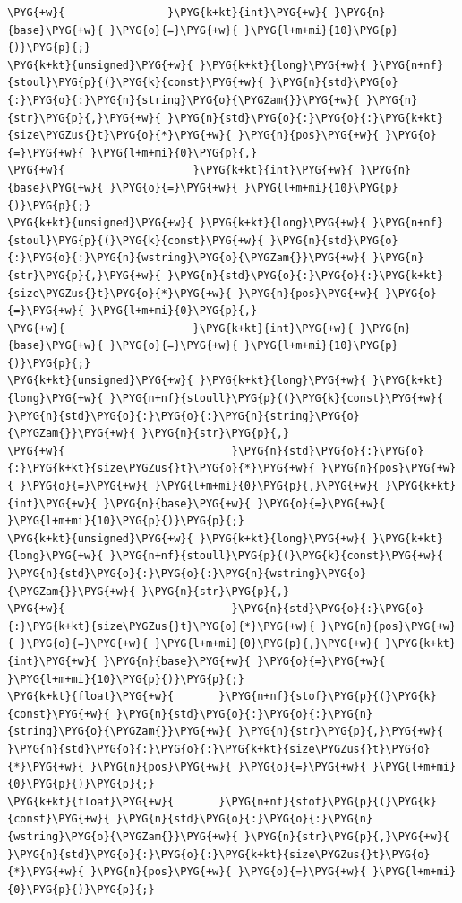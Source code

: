 \begin{codeblockbg}
\begin{Verbatim}[commandchars=\\\{\},breaklines=true,breakanywhere=true,fontsize=\codefont,xleftmargin=17bp]
\PYG{+w}{                }\PYG{k+kt}{int}\PYG{+w}{ }\PYG{n}{base}\PYG{+w}{ }\PYG{o}{=}\PYG{+w}{ }\PYG{l+m+mi}{10}\PYG{p}{)}\PYG{p}{;}
\PYG{k+kt}{unsigned}\PYG{+w}{ }\PYG{k+kt}{long}\PYG{+w}{ }\PYG{n+nf}{stoul}\PYG{p}{(}\PYG{k}{const}\PYG{+w}{ }\PYG{n}{std}\PYG{o}{:}\PYG{o}{:}\PYG{n}{string}\PYG{o}{\PYGZam{}}\PYG{+w}{ }\PYG{n}{str}\PYG{p}{,}\PYG{+w}{ }\PYG{n}{std}\PYG{o}{:}\PYG{o}{:}\PYG{k+kt}{size\PYGZus{}t}\PYG{o}{*}\PYG{+w}{ }\PYG{n}{pos}\PYG{+w}{ }\PYG{o}{=}\PYG{+w}{ }\PYG{l+m+mi}{0}\PYG{p}{,}
\PYG{+w}{                    }\PYG{k+kt}{int}\PYG{+w}{ }\PYG{n}{base}\PYG{+w}{ }\PYG{o}{=}\PYG{+w}{ }\PYG{l+m+mi}{10}\PYG{p}{)}\PYG{p}{;}
\PYG{k+kt}{unsigned}\PYG{+w}{ }\PYG{k+kt}{long}\PYG{+w}{ }\PYG{n+nf}{stoul}\PYG{p}{(}\PYG{k}{const}\PYG{+w}{ }\PYG{n}{std}\PYG{o}{:}\PYG{o}{:}\PYG{n}{wstring}\PYG{o}{\PYGZam{}}\PYG{+w}{ }\PYG{n}{str}\PYG{p}{,}\PYG{+w}{ }\PYG{n}{std}\PYG{o}{:}\PYG{o}{:}\PYG{k+kt}{size\PYGZus{}t}\PYG{o}{*}\PYG{+w}{ }\PYG{n}{pos}\PYG{+w}{ }\PYG{o}{=}\PYG{+w}{ }\PYG{l+m+mi}{0}\PYG{p}{,}
\PYG{+w}{                    }\PYG{k+kt}{int}\PYG{+w}{ }\PYG{n}{base}\PYG{+w}{ }\PYG{o}{=}\PYG{+w}{ }\PYG{l+m+mi}{10}\PYG{p}{)}\PYG{p}{;}
\PYG{k+kt}{unsigned}\PYG{+w}{ }\PYG{k+kt}{long}\PYG{+w}{ }\PYG{k+kt}{long}\PYG{+w}{ }\PYG{n+nf}{stoull}\PYG{p}{(}\PYG{k}{const}\PYG{+w}{ }\PYG{n}{std}\PYG{o}{:}\PYG{o}{:}\PYG{n}{string}\PYG{o}{\PYGZam{}}\PYG{+w}{ }\PYG{n}{str}\PYG{p}{,}
\PYG{+w}{                          }\PYG{n}{std}\PYG{o}{:}\PYG{o}{:}\PYG{k+kt}{size\PYGZus{}t}\PYG{o}{*}\PYG{+w}{ }\PYG{n}{pos}\PYG{+w}{ }\PYG{o}{=}\PYG{+w}{ }\PYG{l+m+mi}{0}\PYG{p}{,}\PYG{+w}{ }\PYG{k+kt}{int}\PYG{+w}{ }\PYG{n}{base}\PYG{+w}{ }\PYG{o}{=}\PYG{+w}{ }\PYG{l+m+mi}{10}\PYG{p}{)}\PYG{p}{;}
\PYG{k+kt}{unsigned}\PYG{+w}{ }\PYG{k+kt}{long}\PYG{+w}{ }\PYG{k+kt}{long}\PYG{+w}{ }\PYG{n+nf}{stoull}\PYG{p}{(}\PYG{k}{const}\PYG{+w}{ }\PYG{n}{std}\PYG{o}{:}\PYG{o}{:}\PYG{n}{wstring}\PYG{o}{\PYGZam{}}\PYG{+w}{ }\PYG{n}{str}\PYG{p}{,}
\PYG{+w}{                          }\PYG{n}{std}\PYG{o}{:}\PYG{o}{:}\PYG{k+kt}{size\PYGZus{}t}\PYG{o}{*}\PYG{+w}{ }\PYG{n}{pos}\PYG{+w}{ }\PYG{o}{=}\PYG{+w}{ }\PYG{l+m+mi}{0}\PYG{p}{,}\PYG{+w}{ }\PYG{k+kt}{int}\PYG{+w}{ }\PYG{n}{base}\PYG{+w}{ }\PYG{o}{=}\PYG{+w}{ }\PYG{l+m+mi}{10}\PYG{p}{)}\PYG{p}{;}
\PYG{k+kt}{float}\PYG{+w}{       }\PYG{n+nf}{stof}\PYG{p}{(}\PYG{k}{const}\PYG{+w}{ }\PYG{n}{std}\PYG{o}{:}\PYG{o}{:}\PYG{n}{string}\PYG{o}{\PYGZam{}}\PYG{+w}{ }\PYG{n}{str}\PYG{p}{,}\PYG{+w}{ }\PYG{n}{std}\PYG{o}{:}\PYG{o}{:}\PYG{k+kt}{size\PYGZus{}t}\PYG{o}{*}\PYG{+w}{ }\PYG{n}{pos}\PYG{+w}{ }\PYG{o}{=}\PYG{+w}{ }\PYG{l+m+mi}{0}\PYG{p}{)}\PYG{p}{;}
\PYG{k+kt}{float}\PYG{+w}{       }\PYG{n+nf}{stof}\PYG{p}{(}\PYG{k}{const}\PYG{+w}{ }\PYG{n}{std}\PYG{o}{:}\PYG{o}{:}\PYG{n}{wstring}\PYG{o}{\PYGZam{}}\PYG{+w}{ }\PYG{n}{str}\PYG{p}{,}\PYG{+w}{ }\PYG{n}{std}\PYG{o}{:}\PYG{o}{:}\PYG{k+kt}{size\PYGZus{}t}\PYG{o}{*}\PYG{+w}{ }\PYG{n}{pos}\PYG{+w}{ }\PYG{o}{=}\PYG{+w}{ }\PYG{l+m+mi}{0}\PYG{p}{)}\PYG{p}{;}

\end{Verbatim}
\end{codeblockbg}
